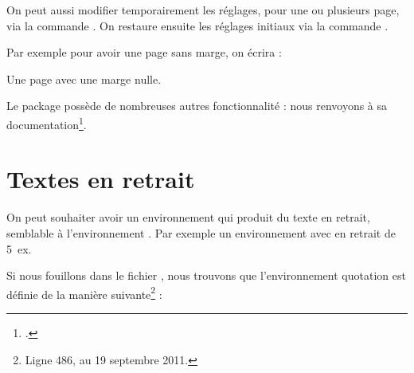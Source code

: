 On peut aussi modifier temporairement les réglages, pour une ou plusieurs page, via la commande . On restaure ensuite les réglages initiaux  via la commande .

Par exemple pour avoir une page sans marge, on écrira :

\begin{latexcode}
Une page avec une marge nulle.
\newpage
\restoregeometry
\end{latexcode}

Le package  possède de nombreuses autres fonctionnalité : nous renvoyons à sa documentation\footcite{geometry}.

\section{Textes en retrait}

On peut souhaiter avoir un environnement qui produit du texte en retrait, semblable à l'environnement . Par exemple un environnement  avec en retrait de 5~ex.

Si nous fouillons dans le fichier , nous trouvons que l'environnement quotation est définie de la manière suivante\footnote{Ligne 486, au 19 septembre 2011.} :

\begin{latexcode}
\newenvironment{quotation}
               {\list{}{\listparindent 1.5em%
                        \itemindent    \listparindent
                        \rightmargin   \leftmargin
                        \parsep        \z@ \@plus\p@}%
                \item\relax}
               {\endlist}
\end{latexcode}

